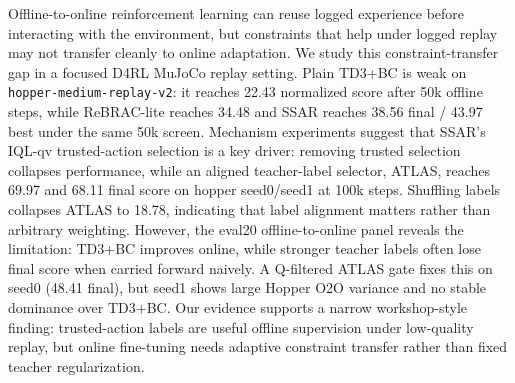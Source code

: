 Offline-to-online reinforcement learning can reuse logged experience before interacting with the environment, but constraints that help under logged replay may not transfer cleanly to online adaptation. We study this constraint-transfer gap in a focused D4RL MuJoCo replay setting. Plain TD3+BC is weak on \texttt{hopper-medium-replay-v2}: it reaches 22.43 normalized score after 50k offline steps, while ReBRAC-lite reaches 34.48 and SSAR reaches 38.56 final / 43.97 best under the same 50k screen. Mechanism experiments suggest that SSAR's IQL-qv trusted-action selection is a key driver: removing trusted selection collapses performance, while an aligned teacher-label selector, ATLAS, reaches 69.97 and 68.11 final score on hopper seed0/seed1 at 100k steps. Shuffling labels collapses ATLAS to 18.78, indicating that label alignment matters rather than arbitrary weighting. However, the eval20 offline-to-online panel reveals the limitation: TD3+BC improves online, while stronger teacher labels often lose final score when carried forward naively. A Q-filtered ATLAS gate fixes this on seed0 (48.41 final), but seed1 shows large Hopper O2O variance and no stable dominance over TD3+BC. Our evidence supports a narrow workshop-style finding: trusted-action labels are useful offline supervision under low-quality replay, but online fine-tuning needs adaptive constraint transfer rather than fixed teacher regularization.
